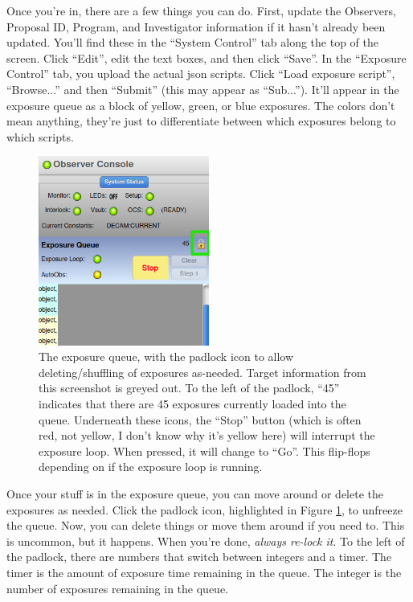 Once you're in, there are a few things you can do. First, update the Observers, Proposal ID, Program, and Investigator information if it hasn't already been updated. You'll find these in the ``System Control'' tab along the top of the screen. Click ``Edit'', edit the text boxes, and then click ``Save''. In the ``Exposure Control'' tab, you upload the actual json scripts. Click ``Load exposure script'', ``Browse...'' and then ``Submit'' (this may appear as ``Sub...''). It'll appear in the exposure queue as a block of yellow, green, or blue exposures. The colors don't mean anything, they're just to differentiate between which exposures belong to which scripts. \\

\begin{figure}
    \centering
    \includegraphics[width=0.5\textwidth]{figs/observing/unlock.png}
    \caption{The exposure queue, with the padlock icon to allow deleting/shuffling of exposures as-needed. Target information from this screenshot is greyed out. To the left of the padlock, ``45'' indicates that there are 45 exposures currently loaded into the queue. Underneath these icons, the ``Stop'' button (which is often red, not yellow, I don't know why it's yellow here) will interrupt the exposure loop. When pressed, it will change to ``Go''. This flip-flops depending on if the exposure loop is running.}
    \label{fig:unlock}
\end{figure}

Once your stuff is in the exposure queue, you can move around or delete the exposures as needed. Click the padlock icon, highlighted in Figure \ref{fig:unlock}, to unfreeze the queue. Now, you can delete things or move them around if you need to. This is uncommon, but it happens. When you're done, \textit{always re-lock it}. To the left of the padlock, there are numbers that switch between integers and a timer. The timer is the amount of exposure time remaining in the queue. The integer is the number of exposures remaining in the queue. \\

